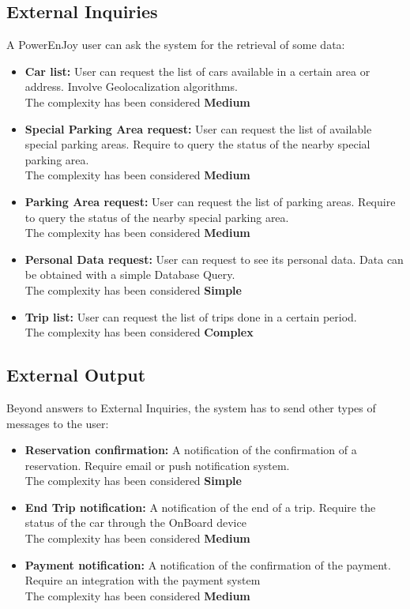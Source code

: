 \subsection{External Inquiries} 
A PowerEnJoy user can ask the system for the retrieval of some data:
\begin{itemize}
\item \textbf{Car list:} User can request the list of cars available in a certain area or address. Involve Geolocalization algorithms.  \\The complexity has been considered \textbf{Medium}
\item  \textbf{Special Parking Area request:} User can request the list of available special parking areas. Require to query the status of the nearby special parking area.\\The complexity has been considered \textbf{Medium}
\item  \textbf{Parking Area request:} User can request the list of parking areas. Require to query the status of the nearby special parking area. \\The complexity has been considered \textbf{Medium}
\item  \textbf{Personal Data request:} User can request to see its personal data. Data can be obtained with a simple Database Query. \\The complexity has been considered \textbf{Simple}
\item  \textbf{Trip list:} User can request the list of trips done in a certain period.\\
The complexity has been considered \textbf{Complex}
\end{itemize}


\subsection{External Output} 
Beyond answers to External Inquiries, the system has to send other types of messages to the user:
\begin{itemize}
\item \textbf{Reservation confirmation:} A notification of the confirmation of a reservation. Require email or push notification system. \\The complexity has been considered \textbf{Simple}
\item \textbf{End Trip notification:} A notification of the end of a trip. Require the status of the car through the OnBoard device \\The complexity has been considered \textbf{Medium}
\item \textbf{Payment notification:} A notification of the confirmation of the payment. Require an integration with the payment system \\The complexity has been considered \textbf{Medium}
\end{itemize}

